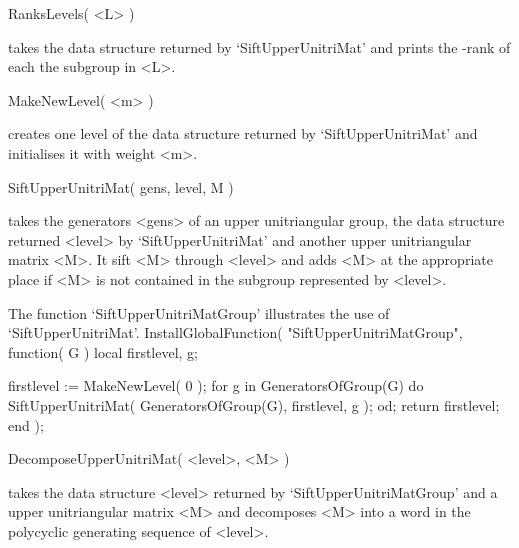 \>RanksLevels( <L> )

takes the data structure returned by `SiftUpperUnitriMat' and prints
the \Z-rank of each the subgroup in <L>.

\>MakeNewLevel( <m> )

creates one level of the data structure returned by
`SiftUpperUnitriMat' and initialises it with weight <m>.

\>SiftUpperUnitriMat( gens, level, M )

takes the generators <gens> of an upper  unitriangular group, the data 
structure returned <level> by `SiftUpperUnitriMat' and another upper
unitriangular matrix <M>.  It sift <M> through <level> and adds <M> at
the appropriate place if <M> is not contained in the subgroup
represented by <level>. 

The function `SiftUpperUnitriMatGroup' illustrates the use of
`SiftUpperUnitriMat'.
\beginexample
InstallGlobalFunction( "SiftUpperUnitriMatGroup", function( G )
    local   firstlevel,  g;

    firstlevel := MakeNewLevel( 0 );
    for g in GeneratorsOfGroup(G) do
        SiftUpperUnitriMat( GeneratorsOfGroup(G), firstlevel, g );
    od;
    return firstlevel;
end );
\endexample

\>DecomposeUpperUnitriMat( <level>, <M> )

takes the data structure <level> returned by `SiftUpperUnitriMatGroup'
and a upper unitriangular matrix <M> and decomposes <M> into a word in
the polycyclic generating sequence of <level>.


